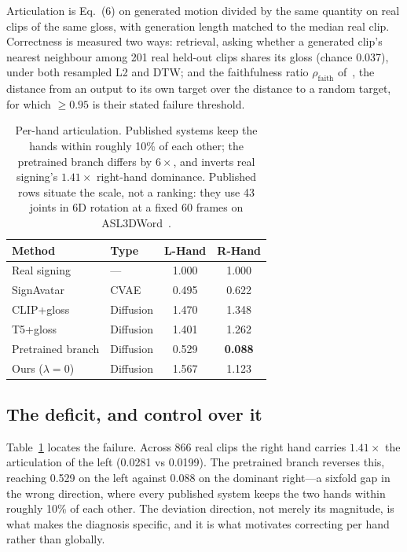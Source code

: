 \documentclass{article}
\begin{document}
Articulation is Eq.~(6) on generated motion divided by the same quantity on real
clips of the same gloss, with generation length matched to the median real clip.
Correctness is measured two ways: retrieval, asking whether a generated clip's
nearest neighbour among 201 real held-out clips shares its gloss (chance 0.037),
under both resampled L2 and DTW; and the faithfulness ratio
$\rho_{\mathrm{faith}}$ of~\cite{hong2026collapse}, the distance from an output to
its own target over the distance to a random target, for which $\geq 0.95$ is
their stated failure threshold.

\begin{table}[t]
\centering
\caption{Per-hand articulation. Published systems keep the hands within roughly
10\% of each other; the pretrained branch differs by $6\times$, and inverts real
signing's $1.41\times$ right-hand dominance. Published rows situate the scale, not
a ranking: they use 43 joints in 6D rotation at a fixed 60 frames on
ASL3DWord~\cite{hong2026phonology}.}
\label{tab:perhand}
\footnotesize
\setlength{\tabcolsep}{5pt}
\begin{tabular}{llcc}
\toprule
Method & Type & L-Hand & R-Hand \\
\midrule
Real signing & --- & 1.000 & 1.000 \\
SignAvatar~\cite{dong2024signavatar} & CVAE & 0.495 & 0.622 \\
CLIP+gloss~\cite{hong2026phonology} & Diffusion & 1.470 & 1.348 \\
T5+gloss~\cite{hong2026phonology} & Diffusion & 1.401 & 1.262 \\
\midrule
Pretrained branch & Diffusion & 0.529 & \textbf{0.088} \\
Ours ($\lambda = 0$) & Diffusion & 1.567 & 1.123 \\
\bottomrule
\end{tabular}
\end{table}

\subsection{The deficit, and control over it}
\label{ssec:control}

Table~\ref{tab:perhand} locates the failure. Across 866 real clips the right hand
carries $1.41\times$ the articulation of the left (0.0281 vs 0.0199). The
pretrained branch reverses this, reaching 0.529 on the left against 0.088 on the
dominant right---a sixfold gap in the wrong direction, where every published
system keeps the two hands within roughly 10\% of each other. The deviation
direction, not merely its magnitude, is what makes the diagnosis specific, and it
is what motivates correcting per hand rather than globally.
\end{document}
